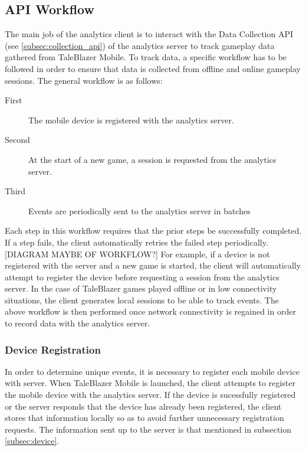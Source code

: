 \subsection{API Workflow}
\label{subsec:api_workflow}

The main job of the analytics client is to interact with the Data Collection API (see \ref{subsec:collection_api}) of the analytics server to track gameplay data gathered from TaleBlazer Mobile. To track data, a specific workflow has to be followed in order to ensure that data is collected from offline and online gameplay sessions. The general workflow is as follows:
	\begin{description}
		\item[First] The mobile device is registered with the analytics server.
		\item[Second] At the start of a new game, a session is requested from the analytics server.
		\item[Third] Events are periodically sent to the analytics server in batches
	\end{description}
Each step in this workflow requires that the prior steps be successfully completed. If a step fails, the client automatically retries the failed step periodically. [DIAGRAM MAYBE OF WORKFLOW?] For example, if a device is not registered with the server and a new game is started, the client will automatically attempt to register the device before requesting a session from the analytics server. In the case of TaleBlazer games played offline or in low connectivity situations, the client generates local sessions to be able to track events. The above workflow is then performed once network connectivity is regained in order to record data with the analytics server.

\subsubsection{Device Registration}

In order to determine unique events, it is necessary to register each mobile device with server. When TaleBlazer Mobile is launched, the client attempts to register the mobile device with the analytics server.
If the device is sucessfully registered or the server responds that the device has already been registered, the client stores that information locally so as to avoid further unnecessary registration requests. The information sent up to the server is that mentioned in subsection \ref{subsec:device}. 

